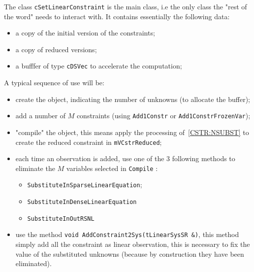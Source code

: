 The class {\tt cSetLinearConstraint} is the  main class, i.e the only class the
"rest of the word" needs to interact with. It contains essentially the following data:

\begin{itemize}
    \item  a copy of the initial version of the constraints;
    \item  a copy of reduced versions;
    \item  a bufffer of type {\tt cDSVec} to accelerate the computation;
\end{itemize}

A typical sequence of use will be:


\begin{itemize}
    \item   create the object, indicating the number of unknowns (to allocate the buffer);
    \item   add a number of $M$ constraints (using {\tt Add1Constr} or {\tt Add1ConstrFrozenVar});
    \item   "compile" the object, this means apply the processing of~\ref{CSTR:NSUBST} to create the
	    reduced constraint in {\tt mVCstrReduced};
    \item   each time an observation is added, use one of the $3$ following methods to eliminate the $M$ variables 
	    selected in {\tt Compile} :
	    \begin{itemize}
                 \item {\tt SubstituteInSparseLinearEquation}; 
                 \item {\tt SubstituteInDenseLinearEquation} 
                 \item {\tt SubstituteInOutRSNL}
	    \end{itemize}
    \item    use the method {\tt void AddConstraint2Sys(tLinearSysSR \&)}, this method simply add all the constraint
             as linear observation, this is necessary to fix the value of the substituted unknowns (because by 
             construction they have been eliminated).

\end{itemize}





